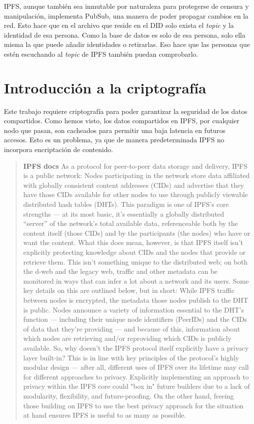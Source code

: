 IPFS, aunque también sea inmutable por naturaleza para protegerse de censura y manipulación, implementa PubSub, una manera de poder propagar cambios en la red. 
Esto hace que en el archivo que reside en el DID solo exista el \textit{topic} y la identidad de esa persona. Como la base de datos es solo de esa persona, solo ella misma la que puede añadir identidades o retirarlas. Eso hace que las personas que estén escuchando al \textit{topic} de IPFS también puedan comprobarlo.
\newpage
\section{Introducción a la criptografía}
Este trabajo requiere criptografía para poder garantizar la seguridad de los datos compartidos. Como hemos visto, los datos compartidos en IPFS, por cualquier nodo que pasan, son cacheados para permitir una baja latencia en futuros accesos. Esto es un problema, ya que de manera predeterminada IPFS no incorpora encriptación de contenido.
\begin{quote}
    \textbf{IPFS docs}
    As a protocol for peer-to-peer data storage and delivery, IPFS is a public network: Nodes participating in the network store data affiliated with globally consistent content addresses (CIDs) and advertise that they have those CIDs available for other nodes to use through publicly viewable distributed hash tables (DHTs). This paradigm is one of IPFS's core strengths — at its most basic, it's essentially a globally distributed ``server'' of the network's total available data, referenceable both by the content itself (those CIDs) and by the participants (the nodes) who have or want the content.
    What this does mean, however, is that IPFS itself isn't explicitly protecting knowledge about CIDs and the nodes that provide or retrieve them. This isn't something unique to the distributed web; on both the d-web and the legacy web, traffic and other metadata can be monitored in ways that can infer a lot about a network and its users. Some key details on this are outlined below, but in short: While IPFS traffic between nodes is encrypted, the metadata those nodes publish to the DHT is public. Nodes announce a variety of information essential to the DHT's function — including their unique node identifiers (PeerIDs) and the CIDs of data that they're providing — and because of this, information about which nodes are retrieving and/or reproviding which CIDs is publicly available.
    So, why doesn't the IPFS protocol itself explicitly have a privacy layer built-in? This is in line with key principles of the protocol's highly modular design — after all, different uses of IPFS over its lifetime may call for different approaches to privacy. Explicitly implementing an approach to privacy within the IPFS core could "box in" future builders due to a lack of modularity, flexibility, and future-proofing. On the other hand, freeing those building on IPFS to use the best privacy approach for the situation at hand ensures IPFS is useful to as many as possible.\cite{web:ipfs_modularity}
\end{quote}
